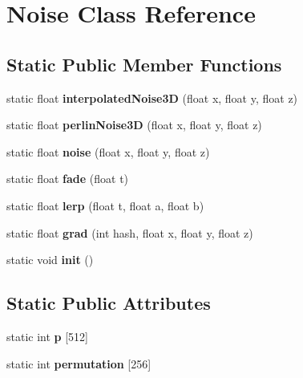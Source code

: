 \hypertarget{classNoise}{
\section{\-Noise \-Class \-Reference}
\label{df/d15/classNoise}
}
\subsection*{\-Static \-Public \-Member \-Functions}
\begin{DoxyCompactItemize}
\item 
\hypertarget{classNoise_a3b3c16d948d9643cca66081ab7d1e870}{
static float {\bfseries interpolated\-Noise3\-D} (float x, float y, float z)}
\label{df/d15/classNoise_a3b3c16d948d9643cca66081ab7d1e870}

\item 
\hypertarget{classNoise_a1c54bfe5f7775755e565c97505fdc516}{
static float {\bfseries perlin\-Noise3\-D} (float x, float y, float z)}
\label{df/d15/classNoise_a1c54bfe5f7775755e565c97505fdc516}

\item 
\hypertarget{classNoise_ab0a04fce415595d0b2286a727f2c6893}{
static float {\bfseries noise} (float x, float y, float z)}
\label{df/d15/classNoise_ab0a04fce415595d0b2286a727f2c6893}

\item 
\hypertarget{classNoise_acdbcb5a383ac16c80e793fba30c13196}{
static float {\bfseries fade} (float t)}
\label{df/d15/classNoise_acdbcb5a383ac16c80e793fba30c13196}

\item 
\hypertarget{classNoise_a1d7ccf9b0859e8f1bfa6dfc774abfbab}{
static float {\bfseries lerp} (float t, float a, float b)}
\label{df/d15/classNoise_a1d7ccf9b0859e8f1bfa6dfc774abfbab}

\item 
\hypertarget{classNoise_a6b8aa358b54cb692b189803c288d5f35}{
static float {\bfseries grad} (int hash, float x, float y, float z)}
\label{df/d15/classNoise_a6b8aa358b54cb692b189803c288d5f35}

\item 
\hypertarget{classNoise_a576df868cf709f4ec38ee8bda59f9464}{
static void {\bfseries init} ()}
\label{df/d15/classNoise_a576df868cf709f4ec38ee8bda59f9464}

\end{DoxyCompactItemize}
\subsection*{\-Static \-Public \-Attributes}
\begin{DoxyCompactItemize}
\item 
\hypertarget{classNoise_a86e24b0c85d50934d74760e80b0d93d5}{
static int {\bfseries p} \mbox{[}512\mbox{]}}
\label{df/d15/classNoise_a86e24b0c85d50934d74760e80b0d93d5}

\item 
static int {\bfseries permutation} \mbox{[}256\mbox{]}
\end{DoxyCompactItemize}


